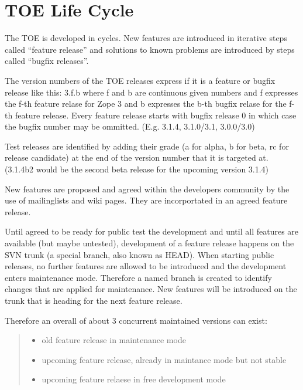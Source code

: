 \documentclass[12pt,english]{scrbook}
\begin{document}
\section{TOE Life Cycle}

The TOE is developed in cycles. New features are introduced in iterative steps
called ``feature release'' and solutions to known problems are introduced by
steps called ``bugfix releases''.

The version numbers of the TOE releases express if it is a feature or bugfix
release like this: 3.f.b where f and b are continuous given numbers and f
expresses the f-th feature relase for Zope 3 and b expresses the b-th bugfix
relase for the f-th feature release. Every feature release starts with bugfix
release 0 in which case the bugfix number may be ommitted. (E.g. 3.1.4,
3.1.0/3.1, 3.0.0/3.0)

Test releases are identified by adding their grade (a for alpha, b for beta, rc
for release candidate) at the end of the version number that it is targeted at.
(3.1.4b2 would be the second beta release for the upcoming version 3.1.4)

New features are proposed and agreed within the developers community by the use
of mailinglists and wiki pages. They are incorportated in an agreed feature
release.

Until agreed to be ready for public test the development and until all
features are available (but maybe untested), development of a feature release
happens on the SVN trunk (a special branch, also known as HEAD). When starting
public releases, no further features are allowed to be introduced and the
development enters maintenance mode. Therefore a named branch is created to
identify changes that are applied for maintenance.  New features will be
introduced on the trunk that is heading for the next feature release.

Therefore an overall of about 3 concurrent maintained versions can exist:
\begin{quote}
\begin{itemize}
\item {} 
old feature release in maintenance mode

\item {} 
upcoming feature release, already in maintance mode but not stable

\item {} 
upcoming feature relaese in free development mode

\end{itemize}
\end{quote}
\end{document}

